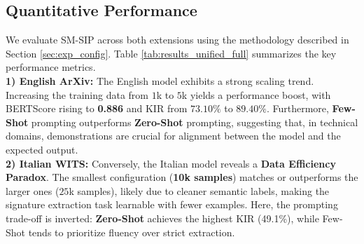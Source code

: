 \documentclass[conference]{IEEEtran}
\begin{document}
\subsection{Quantitative Performance}
We evaluate SM-SIP across both extensions using the methodology described in Section \ref{sec:exp_config}. Table \ref{tab:results_unified_full} summarizes the key performance metrics.\\
\textbf{1) English ArXiv:} The English model exhibits a strong scaling trend. Increasing the training data from $1$k to $5$k yields a performance boost, with BERTScore rising to \textbf{0.886} and KIR from $73.10\%$ to $89.40\%$. Furthermore, \textbf{Few-Shot} prompting outperforms \textbf{Zero-Shot} prompting, suggesting that, in technical domains, demonstrations are crucial for alignment between the model and the expected output.\\
\textbf{2) Italian WITS:} Conversely, the Italian model reveals a \textbf{Data Efficiency Paradox}. The smallest configuration (\textbf{10k samples}) matches or outperforms the larger ones ($25$k samples), likely due to cleaner semantic labels, making the signature extraction task learnable with fewer examples. Here, the prompting trade-off is inverted: \textbf{Zero-Shot} achieves the highest KIR (49.1\%), while Few-Shot tends to prioritize fluency over strict extraction.
\begin{table}[h]
\centering
\caption{Unified Results: English (ArXiv) vs Italian (WITS)}
\label{tab:results_unified_full}
\end{table}
\end{document}
